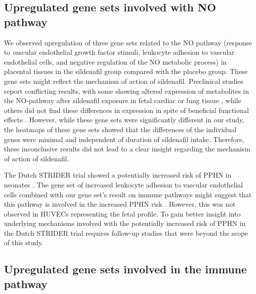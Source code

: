 \documentclass[authordate, empirical]{jote-new-article}
\begin{document}
\subsection{Upregulated gene sets involved with NO pathway }



We observed upregulation of three gene sets related to the NO pathway (response to \emph{v}ascular endothelial growth factor stimuli, leukocyte adhesion to vascular endothelial cells, and negative regulation of the NO metabolic process) in placental tissues in the sildenafil group compared with the placebo group. These gene sets might reflect the mechanism of action of sildenafil. Preclinical studies report conflicting results, with some showing altered expression of metabolites in the NO-pathway after sildenafil exposure in fetal cardiac or lung tissue \parencites{Itani2017}{Shue2014}, while others did not find these differences in expression in spite of beneficial functional effects \parencites{George2013}. However, while these gene sets were significantly different in our study, the heatmaps of these gene sets showed that the differences of the individual genes were minimal and independent of duration of sildenafil intake. Therefore, these inconclusive results did not lead to a clear insight regarding the mechanism of action of sildenafil.



The Dutch STRIDER trial showed a potentially increased risk of PPHN in neonates \parencites{Pels2020}. The gene set of increased leukocyte adhesion to vascular endothelial cells combined with our gene set's result on immune pathways might suggest that this pathway is involved in the increased PPHN risk \parencites{Rafikov2019}{Kuebler2018} {ElChami2012}{Kobayashi2004}. However, this was not observed in HUVECs representing the fetal profile. To gain better insight into underlying mechanisms involved with the potentially increased risk of PPHN in the Dutch STRIDER trial requires follow-up studies that were beyond the scope of this study.







\subsection{Upregulated gene sets involved in the immune pathway }
\end{document}
